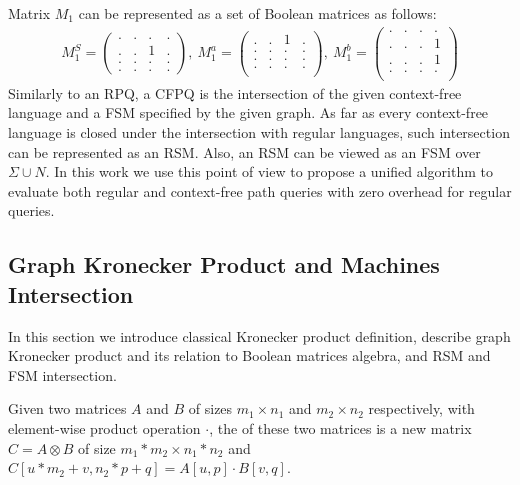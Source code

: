 Matrix $M_1$ can be represented as a set of Boolean matrices as follows:
{\small
\begin{align*}
M_1^S =
\begin{pmatrix}      
    . & . & . & .   \\
    . & . & 1 & .   \\
    . & . & . & .   \\
    . & . & . & .   
\end{pmatrix},~M_1^a =
\begin{pmatrix}       
   . & . & 1 & .   \\
   . & . & . & .   \\
   . & . & . & .   \\
   . & . & . & .   \\
\end{pmatrix},~M_1^b =
\begin{pmatrix}      
    . & . & . & .   \\
    . & . & . & 1   \\
    . & . & . & 1   \\
    . & . & . & .   \\
\end{pmatrix}
\end{align*}
}
Similarly to an RPQ, a CFPQ is the intersection of the given context-free language and a FSM specified by the given graph.
As far as every context-free language is closed under the intersection with regular languages, such intersection can be represented as an RSM.
Also, an RSM can be viewed as an FSM over $\Sigma \cup N$.
In this work we use this point of view to propose a unified algorithm to evaluate both regular and context-free path queries with zero overhead for regular queries.

\subsection{Graph Kronecker Product and Machines Intersection}

In this section we introduce classical Kronecker product definition,
describe graph Kronecker product and its relation to Boolean matrices algebra, 
and RSM and FSM intersection.

\begin{definition}
Given two matrices $A$ and $B$ of sizes $m_1 \times n_1$ and $m_2 \times n_2$ 
respectively, with element-wise product operation $\cdot$, the  of these two matrices is a new matrix $C = A \otimes B$ of size $m_1 * m_2 \times n_1 * n_2$ and $C[u * m_2 + v,n_2 * p + q] = A[u,p] \cdot B[v,q]$.
\end{definition}

